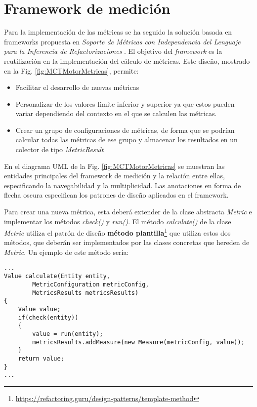 \section{Framework de medición} 
Para la implementación de las métricas se ha seguido la solución basada en frameworks propuesta en \textit{Soporte de Métricas con Independencia del Lenguaje para la Inferencia de Refactorizaciones} \cite{marticorena_soporte_2005}. El objetivo del \textit{framework} es la reutilización en la implementación del cálculo de métricas. Este diseño, mostrado en la Fig. \ref{fig:MCTMotorMetricas}, permite:
\begin{itemize}
	\tightlist
	\item Facilitar el desarrollo de nuevas métricas
	\item Personalizar de los valores límite inferior y superior ya que estos pueden variar dependiendo del contexto en el que se calculen las métricas.
	\item Crear un grupo de configuraciones de métricas, de forma que se podrían calcular todas las métricas de ese grupo y almacenar los resultados en un colector de tipo \textit{MetricResult}
\end{itemize}

En el diagrama UML de la Fig. \ref{fig:MCTMotorMetricas} se muestran las entidades principales del framework de medición y la relación entre ellas, especificando la navegabilidad y la multiplicidad. Las anotaciones en forma de flecha oscura especifican los patrones de diseño\citep{gamma_patrones_2002} aplicados en el framework.

Para crear una nueva métrica, esta deberá extender de la clase abstracta \textit{Metric} e implementar los métodos \textit{check()} y \textit{run()}. El método \textit{calculate()} de la clase \textit{Metric} utiliza el patrón de diseño \textbf{método plantilla}\footnote{\url{https://refactoring.guru/design-patterns/template-method}} que utiliza estos dos métodos, que deberán ser implementados por las clases concretas que hereden de \textit{Metric}. Un ejemplo de este método sería:
\begin{lstlisting}
...
Value calculate(Entity entity, 
		MetricConfiguration metricConfig, 
		MetricsResults metricsResults) 
{
	Value value;
	if(check(entity))
	{
		value = run(entity);
		metricsResults.addMeasure(new Measure(metricConfig, value));
	}
	return value;
}
...
\end{lstlisting}

